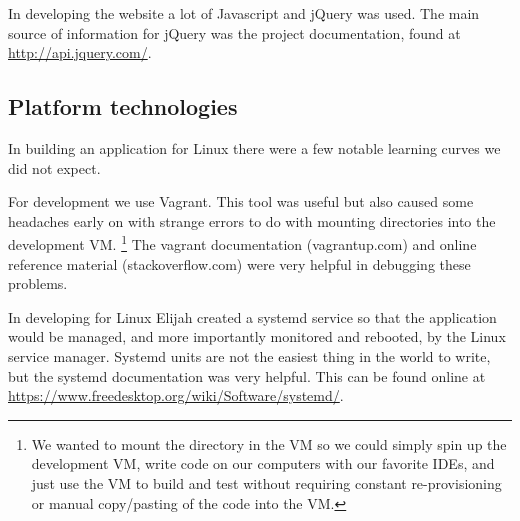 In developing the website a lot of Javascript and jQuery was used.
The main source of information for jQuery was the project documentation, found at \url{http://api.jquery.com/}.

\subsection{Platform technologies}

In building an application for Linux there were a few notable learning curves we did not expect.

For development we use Vagrant.
This tool was useful but also caused some headaches early on with strange errors to do with mounting directories into the development VM.
\footnote{We wanted to mount the directory in the VM so we could simply spin up the development VM, write code on our computers with our favorite IDEs, and just use the VM to build and test without requiring constant re-provisioning or manual copy/pasting of the code into the VM.}
The vagrant documentation (vagrantup.com) and online reference material (stackoverflow.com) were very helpful in debugging these problems.

In developing for Linux Elijah created a systemd service so that the application would be managed, and more importantly monitored and rebooted, by the Linux service manager.
Systemd units are not the easiest thing in the world to write, but the systemd documentation was very helpful.
This can be found online at \url{https://www.freedesktop.org/wiki/Software/systemd/}.
